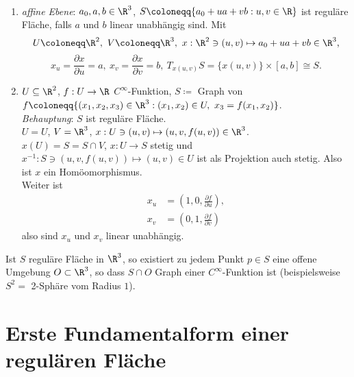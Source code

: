 \begin{example}
  \
  \begin{enumerate}
    \item \emph{affine Ebene}: $ a_0, a, b \in \R^3 $, $ S \coloneqq \{ a_0 + ua + vb : u,v \in \R \} $ ist reguläre Fläche, falls $ a $ und $ b $ linear unabhängig sind. Mit
    \begin{equation*}
      U \coloneqq \R^2, \ V \coloneqq \R^3, \ x: \R^2 \ni (u,v) \mapsto a_0 + ua + vb \in \R^3\text{,}
    \end{equation*}
    \begin{equation*}
      x_u  =\frac{\partial x}{\partial u} = a, \ x_v = \frac{\partial x}{\partial v} = b, \ T_{x(u,v)}S = \{ x(u,v) \} \times [a,b] \cong S\text{.}
    \end{equation*}

    \item $ U \subseteq \R^2 $, $ f: U \to \R $ $ C^\infty $-Funktion, $ S \coloneqq $ Graph von $ f \coloneqq \{ (x_1, x_2, x_3) \in \R^3 : (x_1, x_2) \in U, \ x_3 = f(x_1, x_2) \} $. \\
    \emph{Behauptung}: $ S $ ist reguläre Fläche. \\
    $ U = U $, $ V = \R^3 $, $ x : U \ni (u,v) \mapsto (u,v, f(u,v)) \in \R^3 $. \\
    $ x(U) = S = S \cap V $, $ x: U \to S $ stetig und $ x^{-1}: S \ni (u,v,f(u,v)) \mapsto (u,v) \in U $ ist als Projektion auch stetig. Also ist $ x $ ein Homöomorphismus. \\
    Weiter ist
    \begin{align*}
      x_u &= \left(1,0, \frac{\partial f}{\partial u}\right), \\
      x_v &= \left( 0,1, \frac{\partial f}{\partial v} \right)
    \end{align*}
    also sind $ x_u $ und $ x_v $ linear unabhängig.
  \end{enumerate}
\end{example}

\begin{remark}
  Ist $ S $ reguläre Fläche in $ \R^3 $, so existiert zu jedem Punkt $ p \in S $ eine offene Umgebung $ O \subset \R^3 $, so dass $ S \cap O $ Graph einer $ C^\infty $-Funktion ist (beispielsweise $ S^2 = $ 2-Sphäre vom Radius $ 1 $).
\end{remark}

\section{Erste Fundamentalform einer regulären Fläche}

